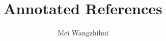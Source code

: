 \documentclass[11pt]{article}
\author{Mei Wangzhihui}
\begin{document}
%  
\title{Annotated References}\nocite{*} %

\maketitle


 
\end{document}
